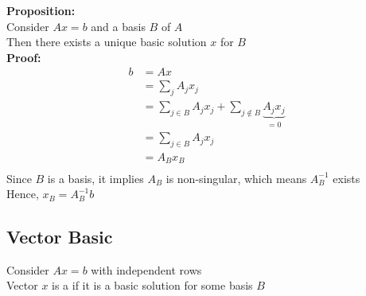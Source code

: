 \documentclass[letterpaper, 12pt]{article}
\newcommand{\red}[1]{{\color{red}{#1}}}
\begin{document}
    \pagebreak
    \textbf{Proposition:}\\
    Consider $Ax = b$ and a basis $B$ of $A$\\
    Then there exists a unique basic solution $x$ for $B$\\
    \bigskip
    \textbf{Proof:}\\
    \begin{align*}
        b &= Ax\\
        &= \sum_jA_jx_j\\
        &= \sum_{j \in B}A_jx_j + \sum_{j \notin B}\underbrace{A_jx_j}_{=0}\\
        &= \sum_{j \in B}A_jx_j\\
        &= A_Bx_B\\
    \end{align*}
    Since $B$ is a basis, it implies $A_B$ is non-singular, which means $A_B^{-1}$ exists\\
    Hence, $x_B = A_B^{-1}b$
    \bigbreak
    \subsection{Vector Basic}
    Consider $Ax = b$ with independent rows\\
    Vector $x$ is a \red{basic solution} if it is a basic solution for some basis $B$\\
    
\end{document}
